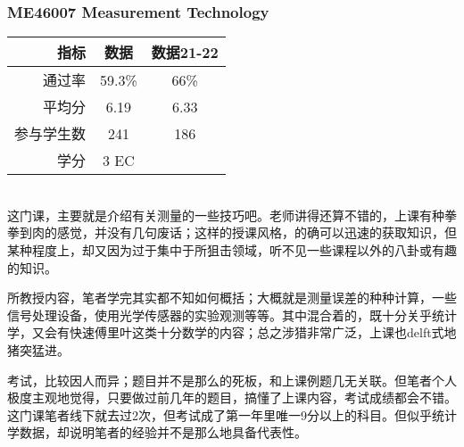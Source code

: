 \subsubsection{ME46007 Measurement Technology}
\begin{minipage}{0.45\textwidth}
\centering
{}
\end{minipage}%
\begin{minipage}{0.45\textwidth}
\raggedleft
\begin{tabular}{r|c|c}
\textbf{指标} & \textbf{数据} & \textbf{数据21-22} \\ \hline
通过率 & 59.3\% & 66\%\\ 
平均分 & 6.19 & 6.33\\ 
参与学生数 & 241 &186\\ 
学分 & 3 EC &\\
\end{tabular}
\end{minipage}\\

这门课，主要就是介绍有关测量的一些技巧吧。老师讲得还算不错的，上课有种拳拳到肉的感觉，并没有几句废话；这样的授课风格，的确可以迅速的获取知识，但某种程度上，却又因为过于集中于所狙击领域，听不见一些课程以外的八卦或有趣的知识。

所教授内容，笔者学完其实都不知如何概括；大概就是测量误差的种种计算，一些信号处理设备，使用光学传感器的实验观测等等。其中混合着的，既十分关乎统计学，又会有快速傅里叶这类十分数学的内容；总之涉猎非常广泛，上课也delft式地猪突猛进。

考试，比较因人而异；题目并不是那么的死板，和上课例题几无关联。但笔者个人极度主观地觉得，只要做过前几年的题目，搞懂了上课内容，考试成绩都会不错。这门课笔者线下就去过2次，但考试成了第一年里唯一9分以上的科目。但似乎统计学数据，却说明笔者的经验并不是那么地具备代表性。

